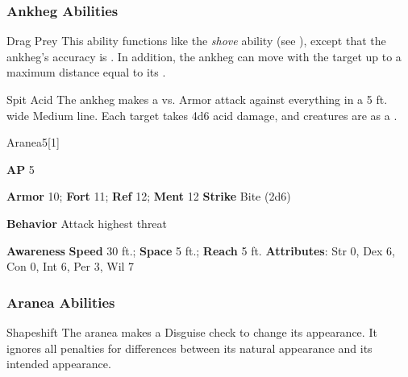 \subsubsection{Ankheg Abilities}

\begin{freeability}{Drag Prey}
This ability functions like the \textit{shove} ability (see ), except that the ankheg's accuracy is .
In addition, the ankheg can move with the target up to a maximum distance equal to its .
\end{freeability}

\vspace{0.5em}
\begin{freeability}{Spit Acid}
The ankheg makes a  vs. Armor attack against everything in a 5 ft. wide Medium line.
\hit Each target takes 4d6 acid damage, and creatures are  as a .
\end{freeability}

\begin{monsection}{Aranea}{5}[1]
\vspace{-1em}\vspace{-1em}
\begin{spellcontent}
\begin{spelltargetinginfo}
{\textbf{AP} 5}

\pari \textbf{Armor} 10;
\textbf{Fort} 11;
\textbf{Ref} 12;
\textbf{Ment} 12
\pari \textbf{Strike} Bite  (2d6)



\pari \textbf{Behavior} Attack highest threat
\end{spelltargetinginfo}
\end{spellcontent}

\begin{monsterfooter}
\pari \textbf{Awareness} 
\pari \textbf{Speed} 30 ft.;
\textbf{Space} 5 ft.;
\textbf{Reach} 5 ft.
\pari \textbf{Attributes}:
Str 0,
Dex 6,
Con 0,
Int 6,
Per 3,
Wil 7
\end{monsterfooter}
\end{monsection}


\subsubsection{Aranea Abilities}

\begin{freeability}{Shapeshift}
The aranea makes a Disguise check to change its appearance.
It ignores all penalties for differences between its natural appearance and its intended appearance.
\end{freeability}

